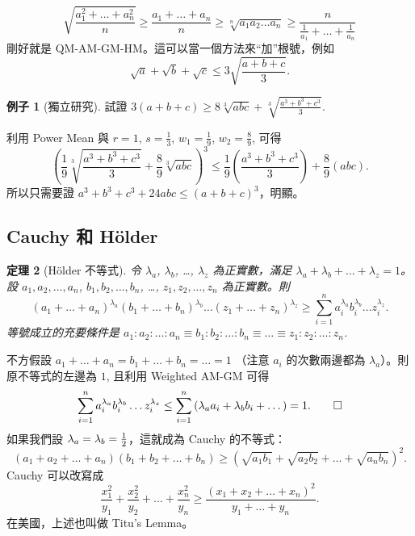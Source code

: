 \documentclass[11pt,nothm]{scrartcl}
\newtheorem{theorem}{\color{blue!40!black}定理}
\theoremstyle{definition}
\newtheorem{example}[theorem]{\color{blue!40!black}例子}
\let\oldendproof\endproof
\renewenvironment{proof}[1][【證】]{%
  \oldproof[\bfseries #1\nopunct]%
}{\oldendproof}
\begin{document}
\[ \sqrt{\frac{a_1^2+\dots+a_n^2}{n}}
  \ge \frac{a_1+\dots+a_n}{n}
  \ge \sqrt[n]{a_1a_2 \dots a_n}
  \ge \frac{n}{\frac{1}{a_1} + \dots + \frac{1}{a_n}} \]
剛好就是 QM-AM-GM-HM。這可以當一個方法來“加”根號，例如
\[ \sqrt a + \sqrt b + \sqrt c \le 3\sqrt{\frac{a+b+c}{3}}. \]

\begin{example}
  [獨立研究] 試證 $3(a+b+c) \ge 8\sqrt[3]{abc} + \sqrt[3]{\frac{a^3+b^3+c^3}{3}}$.
\end{example}
\begin{proof}
  利用 Power Mean 與 $r=1$, $s=\frac 13$, $w_1 = \frac 19$, $w_2 = \frac 89$, 可得
  \[ \left( \frac 19 \sqrt[3]{\frac{a^3+b^3+c^3}{3}} + \frac 89 \sqrt[3]{abc} \right)^3
  \le \frac19 \left( \frac{a^3+b^3+c^3}{3} \right) + \frac 89 \left( abc \right). \]
  所以只需要證 $a^3+b^3+c^3+24abc \le (a+b+c)^3$，明顯。
\end{proof}

\subsection{Cauchy 和 H\"older}
\begin{theorem}[H\"older 不等式]
  令 $\lambda_a$, $\lambda_b$, \dots,
  $\lambda_z$ 為正實數，滿足 $\lambda_a + \lambda_b + \dots + \lambda_z = 1$。 設 $a_1, a_2, \dots, a_n$,
  $b_1, b_2, \dots, b_n$, \dots, $z_1, z_2, \dots, z_n$ 為正實數。則
  \[ \left( a_1+\dots+a_n \right)^{\lambda_a}
    \left( b_1+\dots+b_n \right)^{\lambda_b}
    \dots
    \left( z_1+\dots+z_n \right)^{\lambda_z}
    \ge \sum_{i=1}^n a_i^{\lambda_a} b_i^{\lambda_b} \dots z_i^{\lambda_z}. \]
  等號成立的充要條件是 $a_1 : a_2 : \dots : a_n \equiv b_1 : b_2 : \dots : b_n \equiv \dots \equiv z_1 : z_2 : \dots : z_n$.
\end{theorem}
\begin{proof}
  不方假設 $a_1+\dots+a_n = b_1+\dots+b_n = \dots = 1$ （注意 $a_i$ 的次數兩邊都為 $\lambda_a$）。則原不等式的左邊為 $1$,
  且利用 Weighted AM-GM 可得
  \[ \sum_{i=1}^n a_i^{\lambda_a} b_i^{\lambda_b} \dots z_i^{\lambda_z}
    \le \sum_{i=1}^n \left( \lambda_a a_i + \lambda_b b_i + \dots \right)
    = 1. \qedhere \]
\end{proof}
如果我們設 $\lambda_a = \lambda_b = \frac{1}{2}$，這就成為 Cauchy 的不等式：
\[ \left( a_1+a_2+\dots+a_n \right)\left( b_1+b_2+\dots+b_n \right)
  \ge \left( \sqrt{a_1 b_1} + \sqrt{a_2 b_2} + \dots + \sqrt{a_n b_n} \right)^2. \]
Cauchy 可以改寫成
\[ \frac{x_1^2}{y_1} + \frac{x_2^2}{y_2} + \dots + \frac{x_n^2}{y_n} \ge \frac{\left( x_1+x_2+\dots+x_n \right)^2}{y_1+\dots+y_n}. \]
在美國，上述也叫做 Titu's Lemma。
\end{document}
